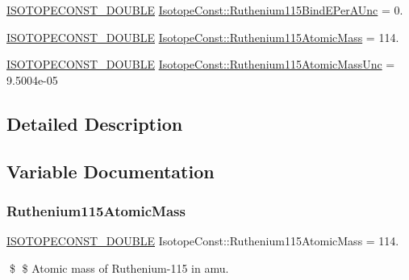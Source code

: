 \begin{DoxyCompactItemize}
\mbox{\hyperlink{group___isotope_const-_macros_ga8f45a7272ce02c0b4c65c44636ed719a}{I\+S\+O\+T\+O\+P\+E\+C\+O\+N\+S\+T\+\_\+\+D\+O\+U\+B\+LE}} \mbox{\hyperlink{group___isotope_const-_ruthenium-_ru115_ga7fe2413b27f746142af60403c50b44e1}{Isotope\+Const\+::\+Ruthenium115\+Bind\+E\+Per\+A\+Unc}} = 0.
\item 
\mbox{\hyperlink{group___isotope_const-_macros_ga8f45a7272ce02c0b4c65c44636ed719a}{I\+S\+O\+T\+O\+P\+E\+C\+O\+N\+S\+T\+\_\+\+D\+O\+U\+B\+LE}} \mbox{\hyperlink{group___isotope_const-_ruthenium-_ru115_ga3516ff279028159cf67a855780caa819}{Isotope\+Const\+::\+Ruthenium115\+Atomic\+Mass}} = 114.
\item 
\mbox{\hyperlink{group___isotope_const-_macros_ga8f45a7272ce02c0b4c65c44636ed719a}{I\+S\+O\+T\+O\+P\+E\+C\+O\+N\+S\+T\+\_\+\+D\+O\+U\+B\+LE}} \mbox{\hyperlink{group___isotope_const-_ruthenium-_ru115_ga0b3aabbb7299d0f0e4b4509c36c7d3e6}{Isotope\+Const\+::\+Ruthenium115\+Atomic\+Mass\+Unc}} = 9.\+5004e-\/05
\end{DoxyCompactItemize}


\subsection{Detailed Description}


\subsection{Variable Documentation}
\mbox{\label{group___isotope_const-_ruthenium-_ru115_ga3516ff279028159cf67a855780caa819}} 
\subsubsection{\texorpdfstring{Ruthenium115\+Atomic\+Mass}{Ruthenium115AtomicMass}}
{\footnotesize\ttfamily \mbox{\hyperlink{group___isotope_const-_macros_ga8f45a7272ce02c0b4c65c44636ed719a}{I\+S\+O\+T\+O\+P\+E\+C\+O\+N\+S\+T\+\_\+\+D\+O\+U\+B\+LE}} Isotope\+Const\+::\+Ruthenium115\+Atomic\+Mass = 114.}

\$ \$ Atomic mass of Ruthenium-\/115 in amu. \mbox{\label{group___isotope_const-_ruthenium-_ru115_ga0b3aabbb7299d0f0e4b4509c36c7d3e6}} 
